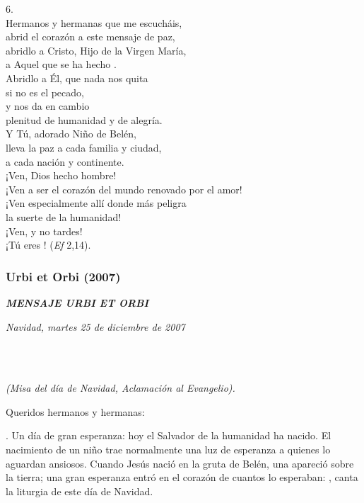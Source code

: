6. \\ Hermanos y hermanas que me escucháis,\\ abrid el corazón a este mensaje de paz,\\ abridlo a Cristo, Hijo de la Virgen María,\\ a Aquel que se ha hecho .\\ Abridlo a Él, que nada nos quita\\ si no es el pecado,\\ y nos da en cambio\\ plenitud de humanidad y de alegría.\\ Y Tú, adorado Niño de Belén,\\ lleva la paz a cada familia y ciudad,\\ a cada nación y continente.\\ ¡Ven, Dios hecho hombre!\\ ¡Ven a ser el corazón del mundo renovado por el amor!\\ ¡Ven especialmente allí donde más peligra\\ la suerte de la humanidad!\\ ¡Ven, y no tardes!\\ ¡Tú eres ! (\emph{Ef} 2,14).

\subsubsection{Urbi et Orbi (2007)} \textbf{\emph{MENSAJE URBI ET ORBI}}

\emph{Navidad, martes 25 de diciembre de 2007}

~

\emph{\\ (Misa del día de Navidad, Aclamación al Evangelio).}

Queridos hermanos y hermanas:

. Un día de gran esperanza: hoy el Salvador de la humanidad ha nacido. El nacimiento de un niño trae normalmente una luz de esperanza a quienes lo aguardan ansiosos. Cuando Jesús nació en la gruta de Belén, una  apareció sobre la tierra; una gran esperanza entró en el corazón de cuantos lo esperaban: , canta la liturgia de este día de Navidad.

